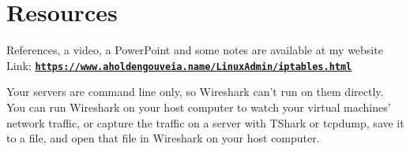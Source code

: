 \documentclass[12pt]{article}
\begin{document}
\section*{Resources}
References, a video, a PowerPoint and some notes are available at my website
Link: \href{https://www.aholdengouveia.name/LinuxAdmin/iptables.html}{\textbf{\nolinkurl{https://www.aholdengouveia.name/LinuxAdmin/iptables.html}}}

Your servers are command line only, so Wireshark can't run on them directly. You can run Wireshark on your host computer to watch your virtual machines' network traffic, or capture the traffic on a server with TShark or tcpdump, save it to a file, and open that file in Wireshark on your host computer.
\end{document}
